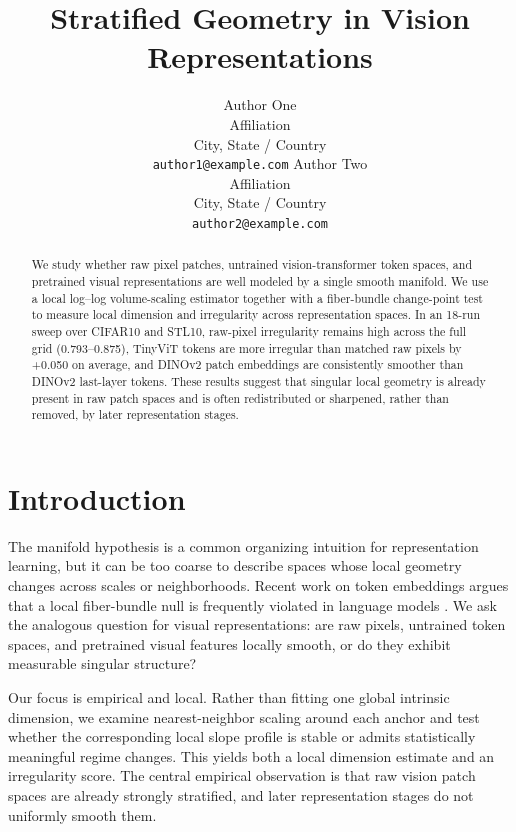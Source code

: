\documentclass{article}
\title{Stratified Geometry in Vision Representations}
\author{
  Author One \\
  Affiliation \\
  City, State / Country \\
  \texttt{author1@example.com}
  \And
  Author Two \\
  Affiliation \\
  City, State / Country \\
  \texttt{author2@example.com}
}
\newcommand{\dataset}[1]{\textsc{#1}}
\begin{document}
\maketitle

\begin{abstract}
We study whether raw pixel patches, untrained vision-transformer token spaces, and pretrained visual representations are well modeled by a single smooth manifold. We use a local log--log volume-scaling estimator together with a fiber-bundle change-point test to measure local dimension and irregularity across representation spaces. In an 18-run sweep over \dataset{CIFAR10} and \dataset{STL10}, raw-pixel irregularity remains high across the full grid (0.793--0.875), TinyViT tokens are more irregular than matched raw pixels by +0.050 on average, and DINOv2 patch embeddings are consistently smoother than DINOv2 last-layer tokens. These results suggest that singular local geometry is already present in raw patch spaces and is often redistributed or sharpened, rather than removed, by later representation stages.
\end{abstract}

\section{Introduction}
The manifold hypothesis is a common organizing intuition for representation learning, but it can be too coarse to describe spaces whose local geometry changes across scales or neighborhoods. Recent work on token embeddings argues that a local fiber-bundle null is frequently violated in language models \citep{robinson2025token}. We ask the analogous question for visual representations: are raw pixels, untrained token spaces, and pretrained visual features locally smooth, or do they exhibit measurable singular structure?

Our focus is empirical and local. Rather than fitting one global intrinsic dimension, we examine nearest-neighbor scaling around each anchor and test whether the corresponding local slope profile is stable or admits statistically meaningful regime changes. This yields both a local dimension estimate and an irregularity score. The central empirical observation is that raw vision patch spaces are already strongly stratified, and later representation stages do not uniformly smooth them.
\end{document}
